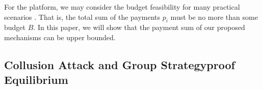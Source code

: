 \documentclass[conference]{IEEEtran}
\theoremstyle{definition}
\begin{document}
{{\color{blue}
For the platform, we may consider the budget feasibility for many practical scenarios \cite{zhao2014crowdsource,singer2013pricing,singla2013truthful}. That is, the total sum of the payments $p_i$ must be no more than some budget $B$. In this paper, we will show that the payment sum of our proposed mechanisms can be upper bounded.
}
}

\subsection{Collusion Attack and Group Strategyproof Equilibrium}
\end{document}
